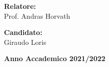 \begin{titlepage}
\noindent
\begin{minipage}[t]{0.47\textwidth}
\vspace{20mm}
{\large{\bf Relatore:}\\
Prof. Andras Horvath}
\end{minipage}
\hfill
\begin{minipage}[t]{0.47\textwidth}\raggedleft
\vspace{20mm}
{\large{\bf Candidato:}\\
Giraudo Loris}
\end{minipage}
\vspace{10mm}
\begin{center}
{\large{\bf 
Anno Accademico 2021/2022}}
\end{center}

\end{titlepage}